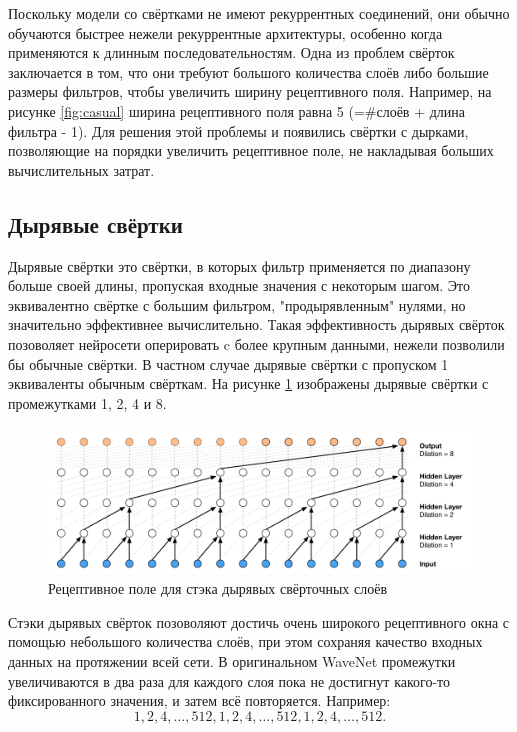 \documentclass[../diploma.tex]{subfiles}
\begin{document}
Поскольку модели со свёртками не имеют рекуррентных соединений, они обычно обучаются быстрее нежели рекуррентные архитектуры, особенно когда применяются к длинным последовательностям. Одна из проблем  свёрток заключается в том, что они требуют большого количества слоёв либо большие размеры фильтров, чтобы увеличить ширину рецептивного поля. Например, на рисунке \ref{fig:casual} ширина рецептивного поля равна 5 (=\#слоёв + длина фильтра - 1). Для решения этой проблемы и появились свёртки с дырками, позволяющие на порядки увеличить рецептивное поле, не накладывая больших вычислительных затрат. 

\newpage
\subsection{Дырявые свёртки}

Дырявые свёртки это свёртки, в которых фильтр применяется по диапазону больше своей длины, пропуская входные значения с некоторым шагом. Это эквивалентно свёртке с большим фильтром, "продырявленным" нулями, но значительно эффективнее вычислительно. Такая эффективность дырявых свёрток позоволяет нейросети оперировать c более крупным данными, нежели позволили бы обычные свёртки. В частном случае дырявые свёртки с пропуском 1 эквиваленты обычным свёрткам. На рисунке \ref{fig:casual_dilated} изображены дырявые свёртки с промежутками 1, 2, 4 и 8. 

\begin{figure}[h!]
  \centering
  \includegraphics[scale=0.32]{img/casual_dilated}
  \caption{Рецептивное поле для стэка дырявых свёрточных слоёв}
  \label{fig:casual_dilated}
\end{figure}

Стэки дырявых свёрток позоволяют достичь очень широкого рецептивного окна с помощью небольшого количества слоёв, при этом сохраняя качество входных данных на протяжении всей сети. В оригинальном WaveNet промежутки увеличиваются в два раза для каждого слоя пока не достигнут какого-то фиксированного значения, и затем всё повторяется. Например:
$$1,2,4,\dots, 512, 1,2,4,\dots, 512, 1,2,4,\dots, 512.$$ 
\end{document}
